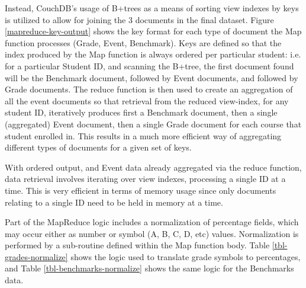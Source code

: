 Instead, CouchDB's usage of B+trees as a means of sorting view indexes by keys is utilized to allow for joining the 3 documents in the final dataset. Figure \ref{mapreduce-key-output} shows the key format for each type of document the Map function processes (Grade, Event, Benchmark). Keys are defined so that the index produced by the Map function is always ordered per particular student: i.e. for a particular Student ID, and scanning the B+tree, the first document found will be the Benchmark document, followed by Event documents, and followed by Grade documents. The reduce function is then used to create an aggregation of all the event documents so that retrieval from the reduced view-index, for any student ID, iteratively produces first a Benchmark document, then a single (aggregated) Event document, then a single Grade document for each course that student enrolled in. This results in a much more efficient way of aggregating different types of documents for a given set of keys.

With ordered output, and Event data already aggregated via the reduce function, data retrieval involves iterating over view indexes, processing a single ID at a time. This is very efficient in terms of memory usage since only documents relating to a single ID need to be held in memory at a time.

Part of the MapReduce logic includes a normalization of percentage fields, which may occur either as number or symbol (A, B, C, D, etc) values. Normalization is performed by a sub-routine defined within the Map function body. Table \ref{tbl-grades-normalize} shows the logic used to translate grade symbols to percentages, and Table \ref{tbl-benchmarks-normalize} shows the same logic for the Benchmarks data.

